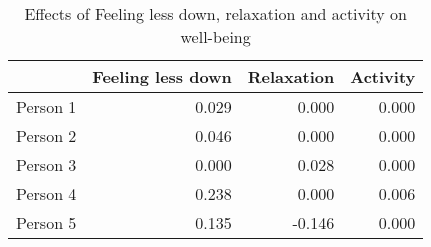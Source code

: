 \begin{table}[ht]
\centering
\begin{tabular}{rrrr}
  \toprule
 & Feeling less down & Relaxation & Activity \\ 
  \midrule
Person 1 & 0.029 & 0.000 & 0.000 \\ 
  Person 2 & 0.046 & 0.000 & 0.000 \\ 
  Person 3 & 0.000 & 0.028 & 0.000 \\ 
  Person 4 & 0.238 & 0.000 & 0.006 \\ 
  Person 5 & 0.135 & -0.146 & 0.000 \\ 
   \bottomrule
\end{tabular}
\caption{Effects of Feeling less down, relaxation and activity on well-being} 
\label{tab:effects_in_aira}
\end{table}

